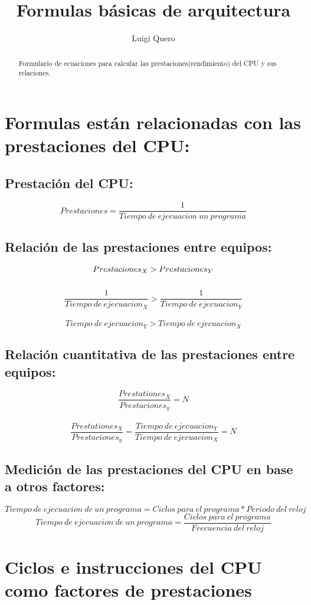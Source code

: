 \documentclass{article}
\title{Formulas básicas de arquitectura}
\author{Luigi Quero}
\begin{document}
\maketitle

\begin{abstract}
Formulario de ecuaciones para calcular las prestaciones(rendimiento) del CPU y sus relaciones.
\end{abstract}

\tableofcontents

\section{Formulas están relacionadas con las prestaciones del CPU:}

\subsection{Prestación del CPU:}
$$
Prestaciones = \frac{1}{Tiempo\ de\ ejecuacion\ un\ programa}
$$

\subsection{Relación de las prestaciones entre equipos:}
$$
Prestaciones_X > Prestaciones_Y\\
$$
\\
$$
\frac{1}{Tiempo\ de\ ejecuacion_X} > \frac{1}{Tiempo\ de\ ejecuacion_Y} 
$$
\\
$$
Tiempo\ de\ ejecuacion_Y > Tiempo\ de\ ejecuacion_X
$$

\subsection{Relación cuantitativa de las prestaciones entre equipos:}
$$
\frac{Prestationes_X}{Prestaciones_y} = N 
$$
\\
$$
\frac{Prestationes_X}{Prestaciones_y} = \frac{Tiempo\ de\ ejecuacion_Y }{Tiempo\ de\ ejecuacion_X} = N
$$

\subsection{Medición de las prestaciones del CPU en base a otros factores:}
$$
Tiempo\ de\ ejecuacion\ de\ un \ programa = Ciclos\ para\ el\ programa * Periodo\ del\ reloj
$$
$$
Tiempo\ de\ ejecuacion\ de\ un \ programa = \frac{ Ciclos\ para\ el\ programa}{Frecuencia\ del\ reloj}
$$
\section{Ciclos e instrucciones del CPU como factores de prestaciones}
\end{document}
